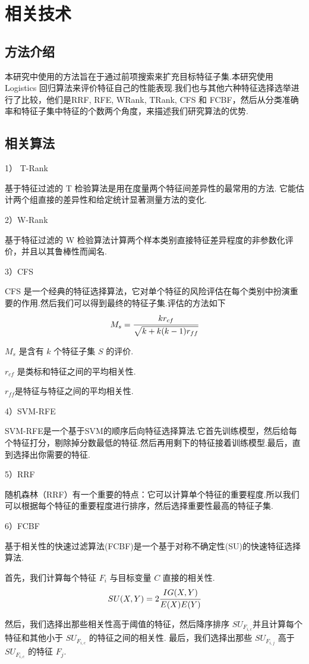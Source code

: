 \documentclass{njubachelor}
\begin{document}
\section{相关技术}
\subsection{方法介绍}
本研究中使用的方法旨在于通过前项搜索来扩充目标特征子集.本研究使用Logistics 回归算法来评价特征自己的性能表现.我们也与其他六种特征选择选举进行了比较，他们是RRF, RFE, WRank, TRank, CFS 和 FCBF，然后从分类准确率和特征子集中特征的个数两个角度，来描述我们研究算法的优势.
\subsection{相关算法}
1） T-Rank

基于特征过滤的 T 检验算法是用在度量两个特征间差异性的最常用的方法. 它能估计两个组直接的差异性和给定统计显著测量方法的变化.

2）W-Rank

基于特征过滤的 W 检验算法计算两个样本类别直接特征差异程度的非参数化评价，并且以其鲁棒性而闻名.

3）CFS

CFS 是一个经典的特征选择算法，它对单个特征的风险评估在每个类别中扮演重要的作用.然后我们可以得到最终的特征子集.评估的方法如下 
$$M_s = \cfrac{kr_{cf}}{\sqrt{k+k(k-1)r_{ff}}}$$

$M_s$ 是含有 $k$ 个特征子集 $S$ 的评价.

$r_{cf}$ 是类标和特征之间的平均相关性.

$r_{ff}$是特征与特征之间的平均相关性.
 
4）SVM-RFE

SVM-RFE是一个基于SVM的顺序后向特征选择算法.它首先训练模型，然后给每个特征打分，剔除掉分数最低的特征.然后再用剩下的特征接着训练模型.最后，直到选择出你需要的特征.

5）RRF

随机森林（RRF）有一个重要的特点：它可以计算单个特征的重要程度.所以我们可以根据每个特征的重要程度进行排序，然后选择重要性最高的特征子集.

6）FCBF

基于相关性的快速过滤算法(FCBF)是一个基于对称不确定性(SU)的快速特征选择算法.

首先，我们计算每个特征 $F_i$ 与目标变量 $C$ 直接的相关性.
$$SU(X,Y) = 2\cfrac{IG(X,Y)}{E(X)E(Y)}$$

然后，我们选择出那些相关性高于阈值的特征，然后降序排序 $SU_{F_{i,c}}$并且计算每个特征和其他小于  $SU_{F_{i,c}}$ 的特征之间的相关性.
最后，我们选择出那些  $SU_{F_{i,j}}$ 高于 $SU_{F_{i,c}}$ 的特征 $F_j$.
\end{document}
